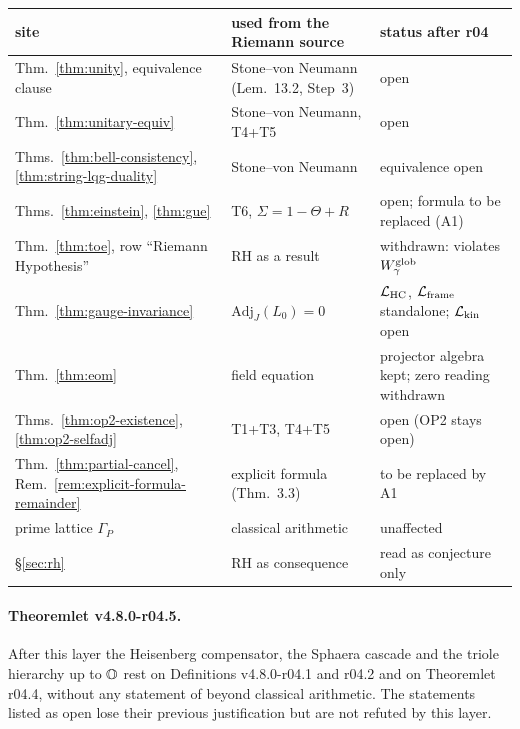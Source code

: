 \begin{center}
\small
\begin{tabular}{@{}>{\raggedright\arraybackslash}p{}>{\raggedright\arraybackslash}p{}>{\raggedright\arraybackslash}p{}@{}}
\toprule
site & used from the Riemann source & status after r04\\
\midrule
Thm.~\ref{thm:unity}, equivalence clause & Stone--von Neumann (Lem.~13.2, Step~3) & open\\
Thm.~\ref{thm:unitary-equiv} & Stone--von Neumann, T4+T5 & open\\
Thms.~\ref{thm:bell-consistency}, \ref{thm:string-lqg-duality} & Stone--von Neumann & equivalence open\\
Thms.~\ref{thm:einstein}, \ref{thm:gue} & T6, \(\Sigma=1-\Theta+R\) & open; formula to be replaced (A1)\\
Thm.~\ref{thm:toe}, row ``Riemann Hypothesis'' & RH as a result & withdrawn: violates \(W_\gamma^{\rm glob}\)\\
Thm.~\ref{thm:gauge-invariance} & \(\mathrm{Adj}_J(L_0)=0\) & \(\mathcal L_{\rm HC}\), \(\mathcal L_{\rm frame}\) standalone; \(\mathcal L_{\rm kin}\) open\\
Thm.~\ref{thm:eom} & field equation & projector algebra kept; zero reading withdrawn\\
Thms.~\ref{thm:op2-existence}, \ref{thm:op2-selfadj} & T1+T3, T4+T5 & open (OP2 stays open)\\
Thm.~\ref{thm:partial-cancel}, Rem.~\ref{rem:explicit-formula-remainder} & explicit formula (Thm.~3.3) & to be replaced by A1\\
prime lattice \(\Gamma_P\) & classical arithmetic & unaffected\\
\S\ref{sec:rh} & RH as consequence & read as conjecture only\\
\bottomrule
\end{tabular}
\end{center}

\paragraph{Theoremlet v4.8.0-r04.5.}
After this layer the Heisenberg compensator, the Sphaera cascade and the triole hierarchy up to
\(\mathbb{O}\) rest on Definitions v4.8.0-r04.1 and r04.2 and on Theoremlet r04.4, without any statement
of \cite{brendecke2026rh} beyond classical arithmetic.  The statements listed as open lose their
previous justification but are not refuted by this layer.

